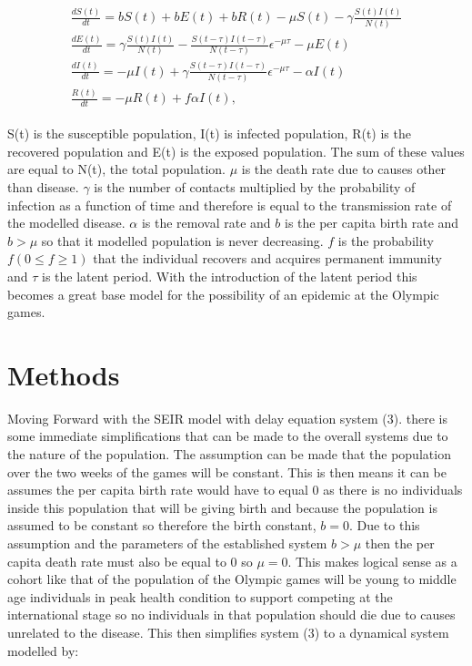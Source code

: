 \documentclass[12pt, oneside]{article}
\begin{document}
\begin{align}
	\begin{split}
	\frac{dS(t)}{dt} = bS(t)+bE(t) + bR(t) -{\mu}S(t)-{\gamma}\frac{S(t)I(t)}{N(t)}\\
	\frac{dE(t)}{dt} = {\gamma}\frac{S(t)I(t)}{N(t)}-\frac{S(t-\tau)I(t-\tau)}{N(t-\tau)}\epsilon^{-\mu\tau}-{\mu}E(t)\\
	\frac{dI(t)}{dt} =-{\mu}I(t) +{\gamma}\frac{S(t-\tau)I(t-\tau)}{N(t-\tau)}\epsilon^{-\mu\tau}-{\alpha}I(t)\\
	\frac{R(t)}{dt} = -{\mu}R(t)+f{\alpha}I(t),
	\end{split}
\end{align}

S(t) is the susceptible population, I(t) is infected population, R(t) is the recovered population and E(t) is the exposed population. The sum of these values are equal to N(t), the total population. $\mu$ is the death rate due to causes other than disease. $\gamma$ is the number of contacts multiplied by the probability of infection as a function of time and therefore is equal to the transmission rate of the modelled disease. $\alpha$ is the removal rate and $ b $ is the per capita birth rate and $ b > \mu $ so that it modelled population is never decreasing. $f$ is the probability $f(0\leq f\geq 1)$ that the individual recovers and acquires permanent immunity and $\tau$ is the latent period.\cite{yan2006seir} With the introduction of the latent period this becomes a great base model for the possibility of an epidemic at the Olympic games.

 \section*{Methods}
 Moving Forward with the SEIR model with delay equation system (3). there is some immediate simplifications that can be made to the overall systems due to the nature of the population. The assumption can be made that the population over the two weeks of the games will be constant. This is then means it can be assumes the per capita birth rate would have to equal 0 as there is no individuals inside this population that will be giving birth and because the population is assumed to be constant so therefore the birth constant, $ b = 0 $. Due to this assumption and the parameters of the established system  $ b > \mu $ then the per capita death rate must also be equal to 0 so $\mu =0$. This makes logical sense as a cohort like that of the population of the Olympic games will be young to middle age individuals in peak health condition to support competing at the international stage so no individuals in that population should die due to causes unrelated to the disease. This then simplifies system (3) to a dynamical system modelled by:
 
\end{document}
